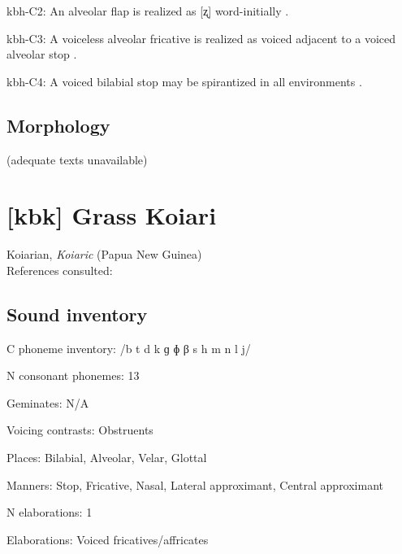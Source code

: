 {\begin{appendixdesc}
\item[kbh-C2:] An alveolar flap is realized as [ʐ] word-initially \citep[78]{Howard1967}.

\item[kbh-C3:] A voiceless alveolar fricative is realized as voiced adjacent to a voiced alveolar stop \citep[78]{Howard1967}.

\item[kbh-C4:] A voiced bilabial stop may be spirantized in all environments \citep[77]{Howard1967}.
\end{appendixdesc}
\subsection*{Morphology}

(adequate texts unavailable)

\section*{[kbk] Grass Koiari}  %
Koiarian, \textit{Koiaric} (Papua New Guinea)\medskip\\
References consulted: \citet{Dutton1996}

\subsection*{Sound inventory}
\begin{appendixdesc}

\item[C phoneme inventory:] /b t d k ɡ ɸ β s h m n l j/

\item[N consonant phonemes:] 13

\item[Geminates:] N/A

\item[Voicing contrasts:] Obstruents

\item[Places:] Bilabial, Alveolar, Velar, Glottal

\item[Manners:] Stop, Fricative, Nasal, Lateral approximant, Central approximant

\item[N elaborations:] 1

\item[Elaborations:] Voiced fricatives/affricates


\end{appendixdesc}}
